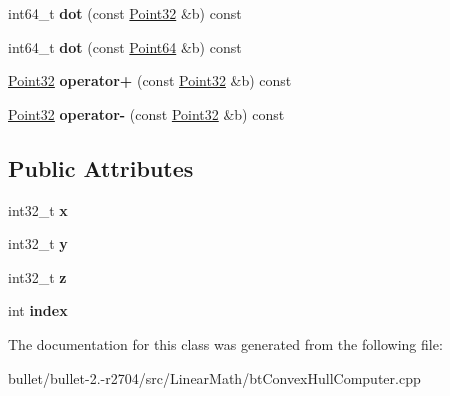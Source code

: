 \begin{DoxyCompactItemize}
\item 
\hypertarget{classbt_convex_hull_internal_1_1_point32_a403b172d7ba381900135aea576025d79}{int64\+\_\+t {\bfseries dot} (const \hyperlink{classbt_convex_hull_internal_1_1_point32}{Point32} \&b) const }\label{classbt_convex_hull_internal_1_1_point32_a403b172d7ba381900135aea576025d79}

\item 
\hypertarget{classbt_convex_hull_internal_1_1_point32_ad0540b839ad891c488c5555ec9ab2ee7}{int64\+\_\+t {\bfseries dot} (const \hyperlink{classbt_convex_hull_internal_1_1_point64}{Point64} \&b) const }\label{classbt_convex_hull_internal_1_1_point32_ad0540b839ad891c488c5555ec9ab2ee7}

\item 
\hypertarget{classbt_convex_hull_internal_1_1_point32_ac534e9e054f73c373286e26aa20cde50}{\hyperlink{classbt_convex_hull_internal_1_1_point32}{Point32} {\bfseries operator+} (const \hyperlink{classbt_convex_hull_internal_1_1_point32}{Point32} \&b) const }\label{classbt_convex_hull_internal_1_1_point32_ac534e9e054f73c373286e26aa20cde50}

\item 
\hypertarget{classbt_convex_hull_internal_1_1_point32_a4f5cd8d91600bf9f0b4e8c553cf288e7}{\hyperlink{classbt_convex_hull_internal_1_1_point32}{Point32} {\bfseries operator-\/} (const \hyperlink{classbt_convex_hull_internal_1_1_point32}{Point32} \&b) const }\label{classbt_convex_hull_internal_1_1_point32_a4f5cd8d91600bf9f0b4e8c553cf288e7}

\end{DoxyCompactItemize}
\subsection*{Public Attributes}
\begin{DoxyCompactItemize}
\item 
\hypertarget{classbt_convex_hull_internal_1_1_point32_aa3e308a9182ba4a4bc721f60a559a478}{int32\+\_\+t {\bfseries x}}\label{classbt_convex_hull_internal_1_1_point32_aa3e308a9182ba4a4bc721f60a559a478}

\item 
\hypertarget{classbt_convex_hull_internal_1_1_point32_a2a44c925f86a8a90f36a936519a833e8}{int32\+\_\+t {\bfseries y}}\label{classbt_convex_hull_internal_1_1_point32_a2a44c925f86a8a90f36a936519a833e8}

\item 
\hypertarget{classbt_convex_hull_internal_1_1_point32_a4dc7e60d34a566c0a407d42b63823162}{int32\+\_\+t {\bfseries z}}\label{classbt_convex_hull_internal_1_1_point32_a4dc7e60d34a566c0a407d42b63823162}

\item 
\hypertarget{classbt_convex_hull_internal_1_1_point32_ad61df6f74c1456243c578e1ea96c9a2f}{int {\bfseries index}}\label{classbt_convex_hull_internal_1_1_point32_ad61df6f74c1456243c578e1ea96c9a2f}

\end{DoxyCompactItemize}


The documentation for this class was generated from the following file\+:\begin{DoxyCompactItemize}
\item 
bullet/bullet-\/2.-\/r2704/src/\+Linear\+Math/bt\+Convex\+Hull\+Computer.\+cpp\end{DoxyCompactItemize}
